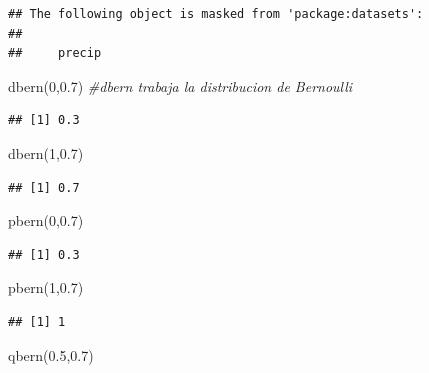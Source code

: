 \documentclass[
]{article}
\newenvironment{Shaded}{\begin{snugshade}}{\end{snugshade}}
\newcommand{\CommentTok}[1]{\textcolor[rgb]{0.56,0.35,0.01}{\textit{#1}}}
\newcommand{\DecValTok}[1]{\textcolor[rgb]{0.00,0.00,0.81}{#1}}
\newcommand{\FloatTok}[1]{\textcolor[rgb]{0.00,0.00,0.81}{#1}}
\newcommand{\FunctionTok}[1]{\textcolor[rgb]{0.00,0.00,0.00}{#1}}
\newcommand{\NormalTok}[1]{#1}
\begin{document}
\begin{verbatim}
## The following object is masked from 'package:datasets':
## 
##     precip
\end{verbatim}

\begin{Shaded}
\begin{Highlighting}[]
\FunctionTok{dbern}\NormalTok{(}\DecValTok{0}\NormalTok{,}\FloatTok{0.7}\NormalTok{) }\CommentTok{\#dbern trabaja la distribucion de Bernoulli}
\end{Highlighting}
\end{Shaded}

\begin{verbatim}
## [1] 0.3
\end{verbatim}

\begin{Shaded}
\begin{Highlighting}[]
\FunctionTok{dbern}\NormalTok{(}\DecValTok{1}\NormalTok{,}\FloatTok{0.7}\NormalTok{)}
\end{Highlighting}
\end{Shaded}

\begin{verbatim}
## [1] 0.7
\end{verbatim}

\begin{Shaded}
\begin{Highlighting}[]
\FunctionTok{pbern}\NormalTok{(}\DecValTok{0}\NormalTok{,}\FloatTok{0.7}\NormalTok{)}
\end{Highlighting}
\end{Shaded}

\begin{verbatim}
## [1] 0.3
\end{verbatim}

\begin{Shaded}
\begin{Highlighting}[]
\FunctionTok{pbern}\NormalTok{(}\DecValTok{1}\NormalTok{,}\FloatTok{0.7}\NormalTok{)}
\end{Highlighting}
\end{Shaded}

\begin{verbatim}
## [1] 1
\end{verbatim}

\begin{Shaded}
\begin{Highlighting}[]
\FunctionTok{qbern}\NormalTok{(}\FloatTok{0.5}\NormalTok{,}\FloatTok{0.7}\NormalTok{)}
\end{Highlighting}
\end{Shaded}
\end{document}
